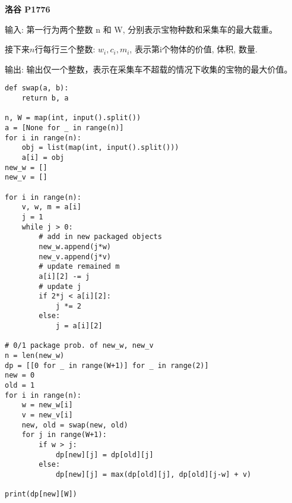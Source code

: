 \documentclass[../main]{subfiles}
\begin{document}
\begin{sloppy}
\textbf{洛谷 P1776}

输入: 第一行为两个整数 n 和 W, 分别表示宝物种数和采集车的最大载重。

接下来$n$行每行三个整数: $w_i, c_i, m_i$, 表示第i个物体的价值, 体积, 数量.

输出: 输出仅一个整数，表示在采集车不超载的情况下收集的宝物的最大价值。

\begin{lstlisting}[style = Python]
def swap(a, b):
    return b, a

n, W = map(int, input().split())
a = [None for _ in range(n)]
for i in range(n):
    obj = list(map(int, input().split()))
    a[i] = obj
new_w = []
new_v = []

for i in range(n):
    v, w, m = a[i]
    j = 1
    while j > 0:
        # add in new packaged objects
        new_w.append(j*w)
        new_v.append(j*v)
        # update remained m
        a[i][2] -= j
        # update j
        if 2*j < a[i][2]:
            j *= 2
        else:
            j = a[i][2]
            
# 0/1 package prob. of new_w, new_v
n = len(new_w)
dp = [[0 for _ in range(W+1)] for _ in range(2)]
new = 0
old = 1
for i in range(n):
    w = new_w[i]
    v = new_v[i]
    new, old = swap(new, old)
    for j in range(W+1):
        if w > j:
            dp[new][j] = dp[old][j]
        else:
            dp[new][j] = max(dp[old][j], dp[old][j-w] + v)
            
print(dp[new][W])
\end{lstlisting}



\end{sloppy}
\end{document}
